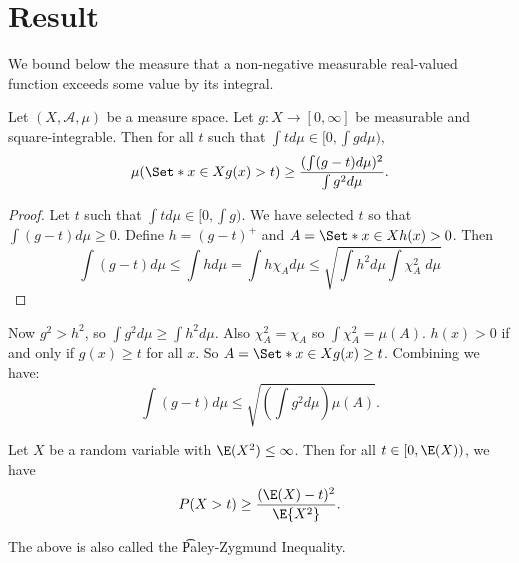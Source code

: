 

\section*{Result}

We bound below the measure
that a non-negative
measurable real-valued
function exceeds some
value by its integral.

\begin{proposition}
Let $(X, \mathcal{A} , \mu )$
be a measure space.
Let $g: X \to [0, \infty]$
be measurable
and square-integrable.
Then for all $t$ such that
$\int  t d\mu  \in [0, \int  g d\mu )$,
    \[
\mu (\Set*{x \in X}{g(x) > t}) \geq \frac{(\int (g - t) d\mu )^2}{\int g^2d\mu }.
    \]
\begin{proof}Let $t$ such that $\int t d\mu  \in [0, \int g)$.
We have selected $t$ so that $\int (g - t)d\mu  \geq 0$.
Define $h = (g - t)^+$
and $A = \Set*{x \in X}{h(x) > 0}$.
Then
    \[
\int  (g - t) d\mu
\leq \int  h d\mu
= \int  h \chi _{A} d\mu
\leq \sqrt{\int  h^2 d\mu  \int  \chi _{A}^2 \; d\mu }
    \]\end{proof}
\end{proposition}
Now $g^2 > h^2$, so $\int g^2 d\mu  \geq \int h^2 d\mu $.
Also $\chi _A^2 = \chi _A$ so $\int \chi _A^2 = \mu (A)$.
$h(x) > 0$ if and only if $g(x) \geq t$ for all $x$.
So $A = \Set*{x \in X}{g(x) \geq t}$.
Combining we have:
    \[
\int  (g - t)d\mu  \leq \sqrt{(\int  g^2 d\mu ) \mu (A)}.
    \]

\begin{proposition}
Let $X$ be a random variable with $\E (X^2) \leq \infty$.
Then for all $t \in [0, \E (X))$, we have
  \[
P(X > t) \geq
\frac{
(\E (X) - t)^2
}{
\E {X^2}
}.
  \]\end{proposition}
The above is also called the \t{Paley-Zygmund Inequality}.

